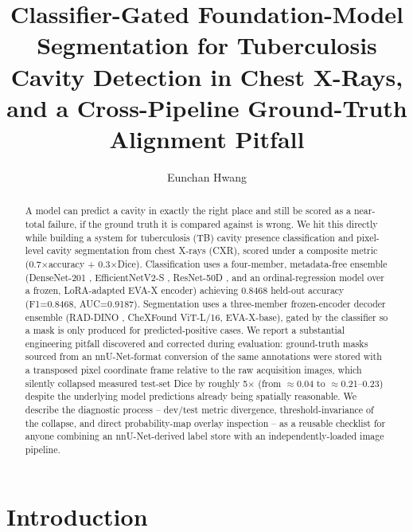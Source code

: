 \documentclass[runningheads]{llncs}
\begin{document}
\title{Classifier-Gated Foundation-Model Segmentation for Tuberculosis Cavity Detection in Chest X-Rays, and a Cross-Pipeline Ground-Truth Alignment Pitfall}


\author{Eunchan Hwang}

\maketitle

\begin{abstract}
A model can predict a cavity in exactly the right place and still be scored
as a near-total failure, if the ground truth it is compared against is
wrong. We hit this directly while building a system for tuberculosis (TB)
cavity presence classification and pixel-level cavity segmentation from
chest X-rays (CXR), scored under a composite metric
(0.7$\times$accuracy + 0.3$\times$Dice). Classification uses a four-member,
metadata-free ensemble (DenseNet-201 \cite{densenet}, EfficientNetV2-S
\cite{effnetv2}, ResNet-50D \cite{resnet}, and an ordinal-regression model
over a frozen, LoRA-adapted \cite{lora} EVA-X \cite{evax} encoder) achieving
0.8468 held-out accuracy (F1=0.8468, AUC=0.9187). Segmentation uses a
three-member frozen-encoder decoder ensemble (RAD-DINO \cite{raddino},
CheXFound \cite{chexfound} ViT-L/16, EVA-X-base), gated by the classifier so
a mask is only produced for predicted-positive cases. We report a
substantial engineering pitfall discovered and corrected during evaluation:
ground-truth masks sourced from an nnU-Net-format \cite{nnunet} conversion
of the same annotations were stored with a transposed pixel coordinate
frame relative to the raw acquisition images, which silently collapsed
measured test-set Dice by roughly 5$\times$ (from $\approx$0.04 to
$\approx$0.21--0.23) despite the underlying model predictions already being
spatially reasonable. We describe the diagnostic process -- dev/test metric
divergence, threshold-invariance of the collapse, and direct probability-map
overlay inspection -- as a reusable checklist for anyone combining an
nnU-Net-derived label store with an independently-loaded image pipeline.
\end{abstract}

\section{Introduction}
\end{document}
